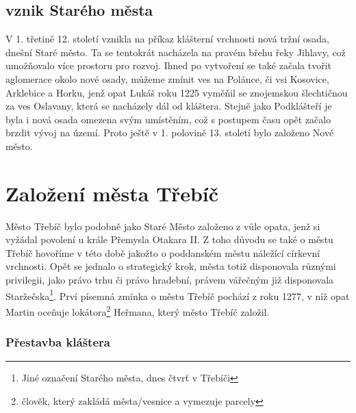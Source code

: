 \documentclass[a4paper,oneside,12p]{report}
\begin{document}
\subsection{vznik Starého města}
V 1. třetině 12. století vznikla na příkaz klášterní vrchnosti nová tržní osada, dnešní Staré město.
Ta se tentokrát nacházela na pravém břehu řeky Jihlavy, což umožňovalo více prostoru pro rozvoj.
Ihned po vytvoření se také začala tvořit aglomerace okolo nové osady, můžeme zmínit ves na Polánce, či vsi Kosovice, Arklebice a Horku, jenž opat Lukáš roku 1225 vyměňil se znojemskou šlechtičnou za ves Oslavany, která se nacházely dál od kláštera.
Stejně jako Podklášteří je byla i nová osada omezena svým umístěním, což s postupem času opět začalo brzdit vývoj na území.
Proto ještě v 1. polovině 13. století bylo založeno Nové město.


\section{Založení města Třebíč}

Město Třebíč bylo podobně jako Staré Město založeno z vůle opata, jenž si vyžádal povolení u krále Přemysla Otakara II. %
Z toho důvodu se také o městu Třebíč hovoříme v této době jakožto o poddanském městu náležící církevní vrchnosti.
Opět se jednalo o strategický krok, města totiž disponovala různými privilegii, jako právo trhu či právo hradební, právem vářečným již disponovala Staržečska\footnote{Jiné označení Starého města, dnes čtvrť v Třebíči}.
Prví písemná zmínka o městu Třebíč pochází z roku 1277, v níž opat Martin oceňuje lokátora\footnote{člověk, který zakládá města/vesnice a vymezuje parcely} Heřmana, který město Třebíč založil.


\subsubsection{Přestavba kláštera}
\end{document}
